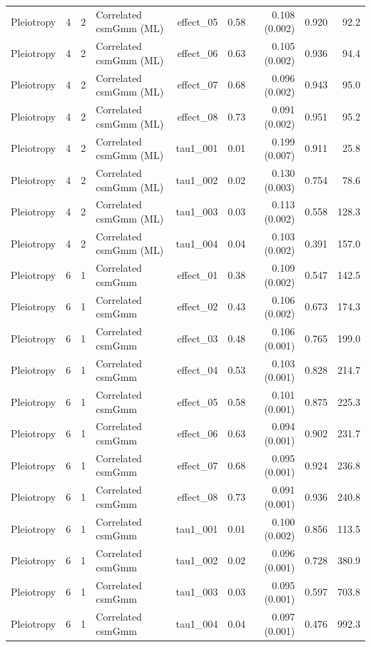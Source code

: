 \begin{longtable}{lcclrrrrr}
Pleiotropy & 4 & 2 & Correlated csmGmm (ML) & effect\_05 & 0.58 & 0.108 (0.002) & 0.920 & 92.2\\
Pleiotropy & 4 & 2 & Correlated csmGmm (ML) & effect\_06 & 0.63 & 0.105 (0.002) & 0.936 & 94.4\\
Pleiotropy & 4 & 2 & Correlated csmGmm (ML) & effect\_07 & 0.68 & 0.096 (0.002) & 0.943 & 95.0\\
Pleiotropy & 4 & 2 & Correlated csmGmm (ML) & effect\_08 & 0.73 & 0.091 (0.002) & 0.951 & 95.2\\
Pleiotropy & 4 & 2 & Correlated csmGmm (ML) & tau1\_001 & 0.01 & 0.199 (0.007) & 0.911 & 25.8\\
Pleiotropy & 4 & 2 & Correlated csmGmm (ML) & tau1\_002 & 0.02 & 0.130 (0.003) & 0.754 & 78.6\\
Pleiotropy & 4 & 2 & Correlated csmGmm (ML) & tau1\_003 & 0.03 & 0.113 (0.002) & 0.558 & 128.3\\
Pleiotropy & 4 & 2 & Correlated csmGmm (ML) & tau1\_004 & 0.04 & 0.103 (0.002) & 0.391 & 157.0\\
Pleiotropy & 6 & 1 & Correlated csmGmm & effect\_01 & 0.38 & 0.109 (0.002) & 0.547 & 142.5\\
Pleiotropy & 6 & 1 & Correlated csmGmm & effect\_02 & 0.43 & 0.106 (0.002) & 0.673 & 174.3\\
Pleiotropy & 6 & 1 & Correlated csmGmm & effect\_03 & 0.48 & 0.106 (0.001) & 0.765 & 199.0\\
Pleiotropy & 6 & 1 & Correlated csmGmm & effect\_04 & 0.53 & 0.103 (0.001) & 0.828 & 214.7\\
Pleiotropy & 6 & 1 & Correlated csmGmm & effect\_05 & 0.58 & 0.101 (0.001) & 0.875 & 225.3\\
Pleiotropy & 6 & 1 & Correlated csmGmm & effect\_06 & 0.63 & 0.094 (0.001) & 0.902 & 231.7\\
Pleiotropy & 6 & 1 & Correlated csmGmm & effect\_07 & 0.68 & 0.095 (0.001) & 0.924 & 236.8\\
Pleiotropy & 6 & 1 & Correlated csmGmm & effect\_08 & 0.73 & 0.091 (0.001) & 0.936 & 240.8\\
Pleiotropy & 6 & 1 & Correlated csmGmm & tau1\_001 & 0.01 & 0.100 (0.002) & 0.856 & 113.5\\
Pleiotropy & 6 & 1 & Correlated csmGmm & tau1\_002 & 0.02 & 0.096 (0.001) & 0.728 & 380.9\\
Pleiotropy & 6 & 1 & Correlated csmGmm & tau1\_003 & 0.03 & 0.095 (0.001) & 0.597 & 703.8\\
Pleiotropy & 6 & 1 & Correlated csmGmm & tau1\_004 & 0.04 & 0.097 (0.001) & 0.476 & 992.3\\

\end{longtable}
